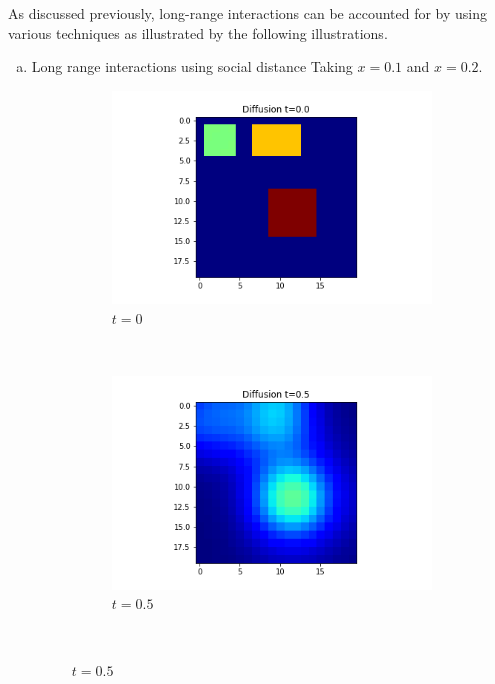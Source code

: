 \documentclass[10pt,a4paper]{article}
\begin{document}
\begin{enumerate}[i)]
    	As discussed previously, long-range interactions can be accounted for by using various techniques as illustrated by the following illustrations.
    	\begin{enumerate}[a)]
    		\item Long range interactions using social distance 
    		Taking $x=0.1$ and $x=0.2$.
    		\begin{figure}[H]
    			\centering
    			\begin{subfigure}[b]{0.25\textwidth}
    				\includegraphics[width=\textwidth]{images/grid-t0-x01.png}
    				\caption{$t=0$}
    				\label{gridt0x01}
    			\end{subfigure}~
    			\begin{subfigure}[b]{0.25\textwidth}
    				\includegraphics[width= \textwidth]{images/grid-t05-x01.png}
    				\caption{$t=0.5$}
    				\label{gridt05x01}
    			\end{subfigure}~

\end{figure}
\end{enumerate}
\end{enumerate}
\end{document}
